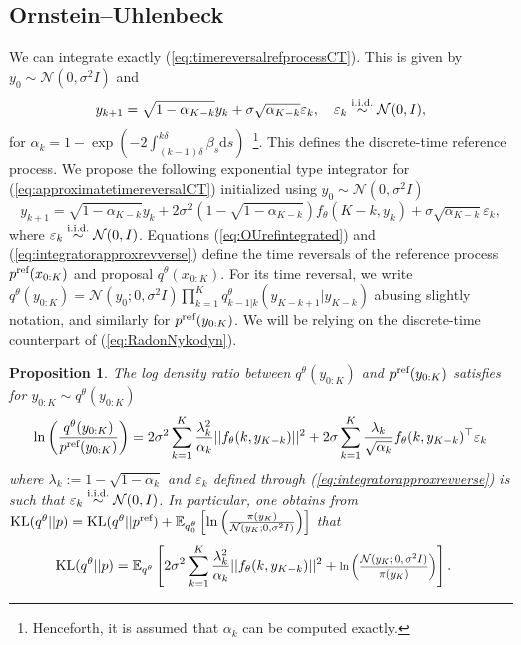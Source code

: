 \documentclass{article} %
\newtheorem{proposition}{Proposition}
\begin{document}
\subsection{Ornstein--Uhlenbeck}
We can integrate exactly (\ref{eq:timereversalrefprocessCT}). This is given by $y_0\sim \mathcal{N}(0,\sigma^2 I)$ and
\begin{equation}\label{eq:OUrefintegrated}
    y_{k+1}=\sqrt{1-\alpha_{K-k}} y_k+\sigma \sqrt{\alpha_{K-k}} \varepsilon_k,\quad \varepsilon_k \overset{\textup{i.i.d.}}{\sim} \mathcal{N}(0,I),
\end{equation}
for $\alpha_k=1-\exp\left(-2 \int_{(k-1)\delta}^{k\delta}\beta_s \mathrm{d}s\right)$~\footnote{Henceforth, it is assumed that $\alpha_k$ can be computed exactly.}. This defines the discrete-time reference process.
We propose the following exponential type integrator \citep{debortoli2022convergence} for (\ref{eq:approximatetimereversalCT}) initialized using $y_0 \sim \mathcal{N}(0,\sigma^2 I)$
\begin{equation}\label{eq:integratorapproxrevverse}
  y_{k+1}=\sqrt{1-\alpha_{K-k}} y_k+2\sigma^2 (1-\sqrt{1-\alpha_{K-k}}) f_\theta(K-k,y_k)+\sigma \sqrt{\alpha_{K-k}}
    \varepsilon_k,
\end{equation}
where $\varepsilon_k \overset{\textup{i.i.d.}}{\sim} \mathcal{N}(0,I)$. Equations (\ref{eq:OUrefintegrated}) and (\ref{eq:integratorapproxrevverse}) define the time reversals of the reference process $p^{\textup{ref}}(x_{0:K})$ and proposal $q^{\theta}(x_{0:K})$. For its time reversal, we write $q^{\theta}(y_{0:K})=\mathcal{N}(y_0;0,\sigma^2 I)\prod_{k=1}^K q^{\theta}_{k-1|k}(y_{K-k+1}|y_{K-k})$ abusing slightly notation, and similarly for $p^{\textup{ref}}(y_{0:K})$.
We will be relying on the discrete-time counterpart of (\ref{eq:RadonNykodyn}).
\begin{proposition}\label{prop:KL}
The log density ratio between $q^\theta(y_{0:K})$ and $p^{\textup{ref}}(y_{0:K})$ satisfies for $y_{0:K} \sim q^\theta(y_{0:K})$
\begin{equation}\label{eq:logDTRN}
 \log  \left(\frac{q^\theta(y_{0:K})}{p^{\textup{ref}}(y_{0:K})}\right)
    =2 \sigma^2 \sum_{k=1}^K \frac{\lambda_k^2}{\alpha_k}||f_\theta(k,y_{K-k})||^2 +2 \sigma \sum_{k=1}^K \frac{\lambda_k}{\sqrt{\alpha_k}}f_\theta(k,y_{K-k})^\top \varepsilon_k 
\end{equation}
where $\lambda_k:=1-\sqrt{1-\alpha_k}$ and $\varepsilon_k$ defined through (\ref{eq:integratorapproxrevverse}) is such that $\varepsilon_k \overset{\textup{i.i.d.}}{\sim} \mathcal{N}(0,I)$. In particular, one obtains from $\KL(q^{\theta}||p)=\KL(q^{\theta}||p^{\textup{ref}})+\mathbb{E}_{q^{\theta}_0}\left[\log \left( \frac{\pi(y_K)}{\mathcal{N}(y_K;0,\sigma^2 I)}\right)\right]$ that
\begin{align}
    \KL(q^{\theta}||p)&
    =\E_{q^\theta}\left[2 \sigma^2 \sum_{k=1}^K \frac{\lambda_k^2}{\alpha_k}||f_\theta(k,y_{K-k})||^2  + \scaleobj{.8}{\ln \left(\frac{\gN(y_K; 0, \sigma^2 I)}{\pi(y_K)}\right)}\right].\label{eq:KLneat}
\end{align}
\end{proposition}
\end{document}
